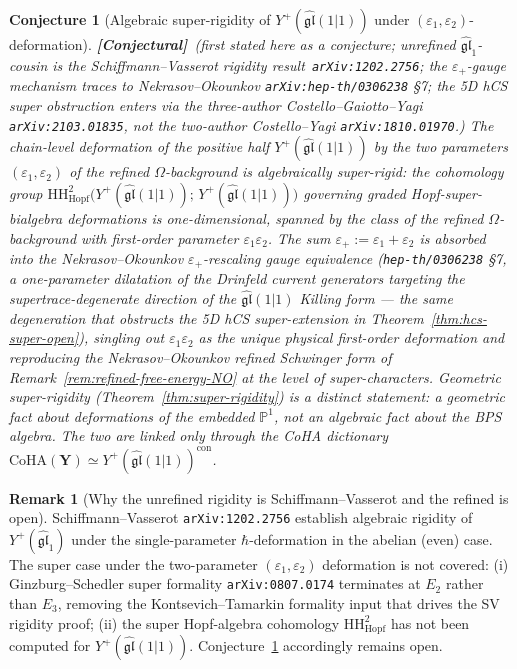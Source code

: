\documentclass[11pt]{amsart}
\newtheorem{conjecture}[theorem]{Conjecture}
\theoremstyle{definition}
\newtheorem{remark}[theorem]{Remark}
\providecommand{\CoHA}{\mathrm{CoHA}}
\providecommand{\bY}{\mathbf{Y}}
\providecommand{\bP}{\mathbb{P}}
\providecommand{\fgl}{\mathfrak{gl}}
\providecommand{\HH}{\mathrm{HH}}
\providecommand{\ClaimStatusConjectured}{\textbf{\textsf{[Conjectural]}}}
\begin{document}
\begin{conjecture}[Algebraic super-rigidity of $Y^{+}(\widehat{\fgl}(1|1))$
under $(\varepsilon_{1},\varepsilon_{2})$-deformation]
\label{conj:algebraic-super-rigidity}
\ClaimStatusConjectured\ \emph{(first stated here as a conjecture;
unrefined $\widehat{\fgl}_{1}$-cousin is the Schiffmann--Vasserot
rigidity result~\texttt{arXiv:1202.2756}; the
$\varepsilon_{+}$-gauge mechanism traces to Nekrasov--Okounkov
\texttt{arXiv:hep-th/0306238} §7; the 5D hCS super obstruction
enters via the three-author Costello--Gaiotto--Yagi
\texttt{arXiv:2103.01835}, not the two-author Costello--Yagi
\texttt{arXiv:1810.01970}.)}
The chain-level deformation of the positive half
$Y^{+}(\widehat{\fgl}(1|1))$ by the two parameters
$(\varepsilon_{1},\varepsilon_{2})$ of the refined $\Omega$-background
is \emph{algebraically super-rigid}: the cohomology group
$\HH^{2}_{\mathrm{Hopf}}\bigl(Y^{+}(\widehat{\fgl}(1|1));\,
Y^{+}(\widehat{\fgl}(1|1))\bigr)$ governing graded
Hopf-super-bialgebra deformations is one-dimensional, spanned by the
class of the refined $\Omega$-background with first-order parameter
$\varepsilon_{1}\varepsilon_{2}$. The sum $\varepsilon_{+} :=
\varepsilon_{1}+\varepsilon_{2}$ is absorbed into the
Nekrasov--Okounkov $\varepsilon_{+}$-rescaling gauge equivalence
(\texttt{hep-th/0306238} §7, a one-parameter dilatation of the
Drinfeld current generators targeting the supertrace-degenerate
direction of the $\widehat{\fgl}(1|1)$ Killing form --- the same
degeneration that obstructs the 5D hCS super-extension in
Theorem~\ref{thm:hcs-super-open}), singling out
$\varepsilon_{1}\varepsilon_{2}$ as the unique physical first-order
deformation and reproducing the Nekrasov--Okounkov refined Schwinger
form of Remark~\ref{rem:refined-free-energy-NO} at the level of
super-characters.
Geometric super-rigidity (Theorem~\ref{thm:super-rigidity}) is a
\emph{distinct} statement: a geometric fact about deformations of the
embedded $\bP^{1}$, not an algebraic fact about the BPS algebra. The
two are linked only through the CoHA dictionary
$\CoHA(\bY) \simeq Y^{+}(\widehat{\fgl}(1|1))^{\mathrm{con}}$.
\end{conjecture}

\begin{remark}[Why the unrefined rigidity is Schiffmann--Vasserot and
the refined is open]
\label{rem:SV-rigidity-unrefined-only}
Schiffmann--Vasserot \texttt{arXiv:1202.2756} establish algebraic
rigidity of $Y^{+}(\widehat{\fgl}_{1})$ under the single-parameter
$\hbar$-deformation in the abelian (even) case. The super case under
the two-parameter $(\varepsilon_{1},\varepsilon_{2})$ deformation is
not covered: (i) Ginzburg--Schedler super formality
\texttt{arXiv:0807.0174} terminates at $E_{2}$ rather than $E_{3}$,
removing the Kontsevich--Tamarkin formality input that drives the SV
rigidity proof; (ii) the super Hopf-algebra cohomology
$\HH^{2}_{\mathrm{Hopf}}$ has not been computed for
$Y^{+}(\widehat{\fgl}(1|1))$. Conjecture~\ref{conj:algebraic-super-rigidity}
accordingly remains open.
\end{remark}
\end{document}
